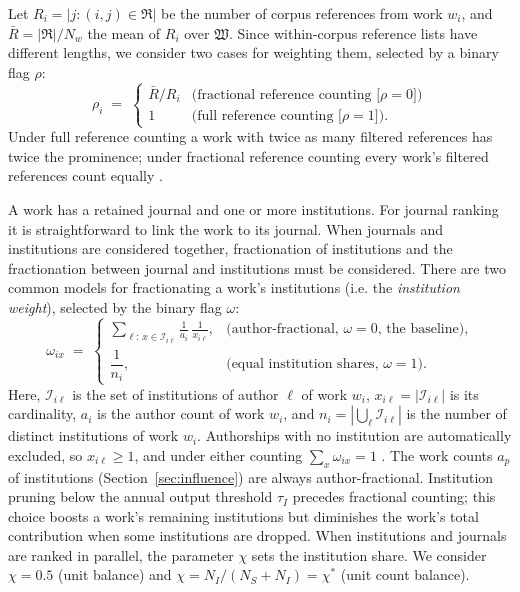 Let $R_i = |{j : (i,j)\in\mathfrak{R}}|$ be the number of corpus references from work $w_i$, and $\bar{R} = |\mathfrak{R}|/N_w$ the mean of $R_i$ over $\mathfrak{W}$. Since within-corpus reference lists have different lengths, we consider two cases for weighting them, selected by a binary flag $\rho$:
\begin{equation}
	\rho_i \;=\;
	\begin{cases}
		\bar{R}/R_i & \text{(fractional reference counting [$\rho=0$])} \\
		1 & \text{(full reference counting [$\rho=1$])}.
	\end{cases}
	\label{eq:rho}
\end{equation}
Under full reference counting a work with twice as many filtered references has twice
the prominence; under fractional reference counting every work's filtered references count
equally \citep{zittModifyingJournalImpact2008}.

A work has a retained journal and one or more institutions. For journal ranking it is straightforward to link the work to its journal. When journals and institutions are considered together, fractionation of institutions and the fractionation between journal and institutions must be considered. 
There are two common models for fractionating a work's institutions (i.e. the \textit{institution weight}), selected by the binary flag $\omega$:
\begin{equation}
  \omega_{ix} \;=\;
  \begin{cases}
	\displaystyle\sum_{\ell:\,x\in\mathcal{I}_{i\ell}}
    \frac{1}{a_i}\,\frac{1}{x_{i\ell}}, & \text{(author-fractional, $\omega=0$, the baseline),} \\[14pt]
    \dfrac{1}{n_i}, & \text{(equal institution shares, $\omega=1$).}
	\end{cases}
  \label{eq:omega}
\end{equation}
Here, $\mathcal{I}_{i\ell}$ is the set of institutions of author $\ell$ of work $w_i$, $x_{i\ell}=|\mathcal{I}_{i\ell}|$ is its cardinality, $a_i$ is the author count of work $w_i$, and $n_i = |\bigcup_\ell \mathcal{I}_{i\ell}|$ is the number of distinct institutions of work $w_i$. Authorships with no institution are automatically excluded, so $x_{i\ell}\ge 1$, and under either counting $\sum_x\omega_{ix}=1$ \citep{waltmanFieldnormalizedCitationImpact2015}. The work counts $a_p$ of institutions (Section~\ref{sec:influence}) are always author-fractional. Institution pruning below the annual output threshold $\tau_I$ precedes fractional counting; this choice boosts a work's remaining institutions but diminishes the work's total contribution when some institutions are dropped.
When institutions and journals are ranked in parallel, the parameter $\chi$ sets the institution share. We consider $\chi = 0.5$ (unit balance) and $\chi=N_I/(N_S+N_I) = \chi^*$ (unit count balance).


